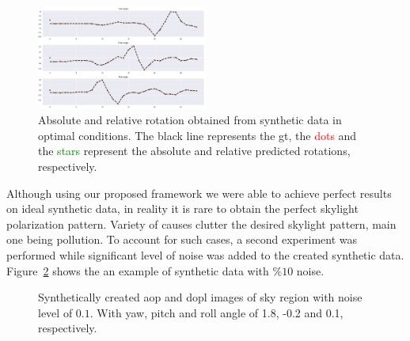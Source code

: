\begin{figure}
  \includegraphics[width=0.5\textwidth]{./content/experiments/figures/ideal-syn-abs-rel-2.png}
  \caption{Absolute and relative rotation obtained from synthetic data in
    optimal conditions. The black line represents the \gls{gt}, the
    \textcolor{red}{dots} and the \textcolor{green}{stars} represent the
    absolute and relative predicted rotations, respectively.}
  \label{fig:res-syn-ideal-abs-rel}
\end{figure}

Although using our proposed framework we were able to achieve perfect results
on ideal synthetic data, in reality it is rare to obtain the perfect skylight
polarization pattern. Variety of causes clutter the desired skylight pattern,
main one being pollution. To account for such cases, a second experiment was
performed while significant level of noise was added to the created synthetic
data.
Figure~\ref{fig:aop-dop-syn-noisy} shows the an example of synthetic data with
$\%10$ noise.

\begin{figure}
  \centering
  \hfill
  \label{fig:aop-noise-syn}
  \hspace*{\fill}
  \label{fig:dop-noise-syn}
  \caption{Synthetically created \gls{aop} and \gls{dopl} images of sky
      region with noise level of $0.1$. With yaw, pitch and roll angle of 1.8, -0.2 and 0.1, respectively.}
  \label{fig:aop-dop-syn-noisy}
\end{figure}

